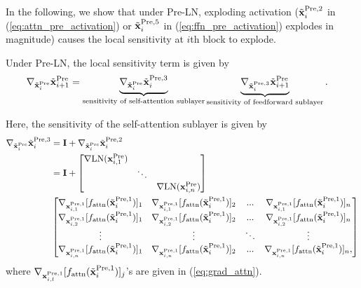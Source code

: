 \documentclass[journal]{IEEEtran}
\newcommand{\bfI}{{\bf I}}
\newcommand{\bfx}{{\bf x}}
\theoremstyle{plain}
\theoremstyle{definition}
\theoremstyle{remark}
\begin{document}
In the following, we show that under Pre-LN, exploding activation ($\tilde{\bfx}_i^{{\rm Pre}, 2}$ in (\ref{eq:attn_pre_activation}) or $\tilde{\bfx}_i^{{\rm Pre}, 5}$ in (\ref{eq:ffn_pre_activation}) explodes in magnitude) causes the local sensitivity at $i$th block to explode.

Under Pre-LN, the local sensitivity term is given by
\begin{align}
    \nabla_{\tilde{\bfx}_{i}^{\rm Pre}} \tilde{\bfx}_{i+1}^{\rm Pre} &= \underbrace{\nabla_{\tilde{\bfx}_i^{{\rm Pre}}} \tilde{\bfx}_i^{{\rm Pre}, 3}}_{\text{sensitivity of self-attention sublayer}}  \underbrace{\nabla_{\tilde{\bfx}_i^{{\rm Pre}, 3}} \tilde{\bfx}_{i+1}^{{\rm Pre}}}_{\text{sensitivity of feedforward sublayer}}.
\end{align}

Here, the sensitivity of the self-attention sublayer is given by
\begin{align}
    \nabla_{\tilde{\bfx}_i^{{\rm Pre}}} \tilde{\bfx}_i^{{\rm Pre}, 3} &= \bfI +  \nabla_{\tilde{\bfx}_i^{{\rm Pre}}} \tilde{\bfx}_i^{{\rm Pre}, 2} \\
    &= \bfI + \begin{bmatrix}
\nabla {\rm LN}(\bfx^{{\rm Pre}}_{i, 1}) &        &        \\
                 & \ddots &        \\
                 &        & \nabla {\rm LN}(\bfx^{{\rm Pre}}_{i, n})
\end{bmatrix} \\ &
\begin{bmatrix}
\nabla_{\bfx^{{\rm Pre},1}_{i, 1}} [f_{\rm attn}(\tilde{\bfx}^{{\rm Pre},1}_{i})]_1 &  \nabla_{\bfx^{{\rm Pre},1}_{i, 1}} [f_{\rm attn}(\tilde{\bfx}^{{\rm Pre},1}_{i})]_2  & ...    &    \nabla_{\bfx^{{\rm Pre},1}_{i, 1}} [f_{\rm attn}(\tilde{\bfx}^{{\rm Pre},1}_{i})]_n    \\
\nabla_{\bfx^{{\rm Pre},1}_{i, 2}} [f_{\rm attn}(\tilde{\bfx}^{{\rm Pre},1}_{i})]_1 &  \nabla_{\bfx^{{\rm Pre},1}_{i, 2}} [f_{\rm attn}(\tilde{\bfx}^{{\rm Pre},1}_{i})]_2  & ...    &    \nabla_{\bfx^{{\rm Pre},1}_{i, 2}} [f_{\rm attn}(\tilde{\bfx}^{{\rm Pre},1}_{i})]_n    \\
     \vdots        &  \vdots  & \ddots &    \vdots    \\
\nabla_{\bfx^{{\rm Pre},1}_{i, n}} [f_{\rm attn}(\tilde{\bfx}^{{\rm Pre},1}_{i})]_1 &  \nabla_{\bfx^{{\rm Pre},1}_{i, n}} [f_{\rm attn}(\tilde{\bfx}^{{\rm Pre},1}_{i})]_2  & ...    &    \nabla_{\bfx^{{\rm Pre},1}_{i, n}} [f_{\rm attn}(\tilde{\bfx}^{{\rm Pre},1}_{i})]_n,   
\end{bmatrix}
\end{align}
where $\nabla_{\bfx^{{\rm Pre},1}_{i, l}} [f_{\rm attn}(\tilde{\bfx}^{{\rm Pre},1}_{i})]_j$'s are given in (\ref{eq:grad_attn}).
\end{document}
